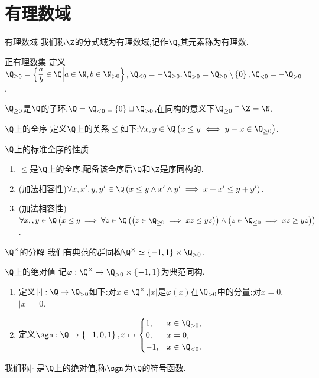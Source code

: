 \section{有理数域}

\begin{definition}{有理数域}{}
	我们称$\Z$的分式域为有理数域,记作$\Q$,其元素称为有理数.
\end{definition}

\begin{definition}{正有理数集}{}
	定义$\Q_{\geq 0}=\left\{\dfrac{a}{b}\in\Q\middle|a\in\N,b\in\N_{>0}\right\},\Q_{\leq 0}=-\Q_{\geq 0},\Q_{>0}=\Q_{\geq 0}\setminus\left\{0\right\},\Q_{<0}=-\Q_{>0}$.
\end{definition}

\begin{proposition}{}{}
	$\Q_{\geq 0}$是$\Q$的子环,$\Q=\Q_{<0}\sqcup\left\{0\right\}\sqcup\Q_{>0}$,在同构的意义下$\Q_{\geq 0}\cap\Z=\N$.
\end{proposition}

\begin{definition}{$\Q$上的全序}{}
	定义$\Q$上的关系$\leq$如下:$\forall x,y\in\Q\left(x\leq y\iff y-x\in\Q_{\geq 0}\right)$.
\end{definition}

\begin{proposition}{$\Q$上的标准全序的性质}{}
	\begin{enumerate}
		\item $\leq$是$\Q$上的全序,配备该全序后$\Q$和$\Z$是序同构的.
		\item (加法相容性)$\forall x,x^{\prime},y,y^{\prime}\in\Q\left(x\leq y\wedge x^{\prime}\wedge y^{\prime}\implies x+x^{\prime}\leq y+y^{\prime}\right)$.
		\item (加法相容性)$\forall x,,y\in\Q\left(x\leq y\implies \forall z\in\Q\left(\left(z\in\Q_{\geq 0}\implies xz\leq yz\right)\right)\wedge\left(z\in\Q_{\leq 0}\implies xz\geq yz\right)\right)$.
	\end{enumerate}
\end{proposition}

\begin{proposition}{$\Q^{\times}$的分解}{}
	我们有典范的群同构$\Q^{\times}\simeq\left\{-1,1\right\}\times\Q_{>0}$.
\end{proposition}

\begin{definition}{$\Q$上的绝对值}{}
	记$\varphi:\Q^{\times}\to\Q_{>0}\times\left\{-1,1\right\}$为典范同构.
	\begin{enumerate}
		\item 定义$\left|\cdot\right|:\Q\to\Q_{>0}$如下:对$x\in\Q^{\times}$,$\left|x\right|$是$\varphi\left(x\right)$在$\Q_{>0}$中的分量;对$x=0$,$\left|x\right|=0$.
		\item 定义$\sgn:\Q\to\left\{-1,0,1\right\},x\mapsto
		\begin{cases}
			1,&x\in\Q_{>0},\\
			0,&x=0,\\
			-1,&x\in\Q_{<0}.
		\end{cases}$
	\end{enumerate}
	我们称$\left|\cdot\right|$是$\Q$上的绝对值,称$\sgn$为$\Q$的符号函数.
\end{definition}


